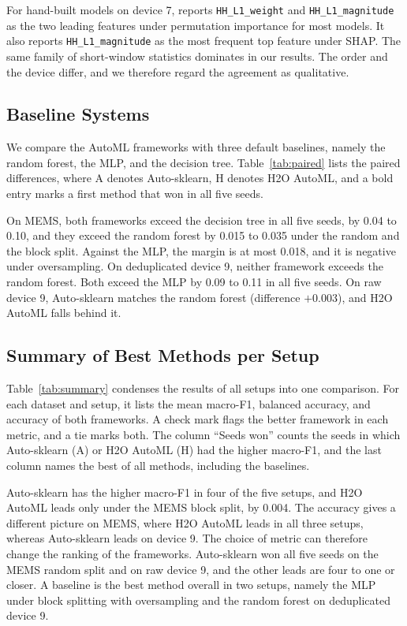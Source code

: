 For hand-built models on device 7, \cite{gummadi2024xaiiot} reports \texttt{HH\_L1\_weight} and \texttt{HH\_L1\_magnitude} as the two leading features under permutation importance for most models. It also reports \texttt{HH\_L1\_magnitude} as the most frequent top feature under SHAP. The same family of short-window statistics dominates in our results. The order and the device differ, and we therefore regard the agreement as qualitative.


\subsection{Baseline Systems}
We compare the AutoML frameworks with three default baselines, namely the random forest, the MLP, and the decision tree. Table~\ref{tab:paired} lists the paired differences, where A denotes Auto-sklearn, H denotes H2O AutoML, and a bold entry marks a first method that won in all five seeds.

On MEMS, both frameworks exceed the decision tree in all five seeds, by 0.04 to 0.10, and they exceed the random forest by 0.015 to 0.035 under the random and the block split. Against the MLP, the margin is at most 0.018, and it is negative under oversampling. On deduplicated device 9, neither framework exceeds the random forest. Both exceed the MLP by 0.09 to 0.11 in all five seeds. On raw device 9, Auto-sklearn matches the random forest (difference $+0.003$), and H2O AutoML falls behind it.

\subsection{Summary of Best Methods per Setup}
Table~\ref{tab:summary} condenses the results of all setups into one comparison. For each dataset and setup, it lists the mean macro-F1, balanced accuracy, and accuracy of both frameworks. A check mark flags the better framework in each metric, and a tie marks both. The column ``Seeds won'' counts the seeds in which Auto-sklearn (A) or H2O AutoML (H) had the higher macro-F1, and the last column names the best of all methods, including the baselines.

Auto-sklearn has the higher macro-F1 in four of the five setups, and H2O AutoML leads only under the MEMS block split, by 0.004. The accuracy gives a different picture on MEMS, where H2O AutoML leads in all three setups, whereas Auto-sklearn leads on device 9. The choice of metric can therefore change the ranking of the frameworks. Auto-sklearn won all five seeds on the MEMS random split and on raw device 9, and the other leads are four to one or closer. A baseline is the best method overall in two setups, namely the MLP under block splitting with oversampling and the random forest on deduplicated device 9.

